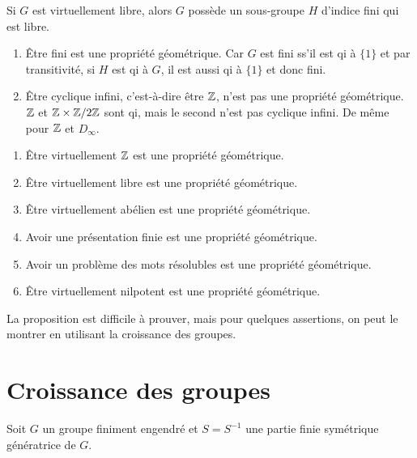   \begin{ex}
    Si $G$ est virtuellement libre, alors $G$ possède un sous-groupe $H$ d'indice fini qui est libre.
  \end{ex}

  \begin{exs}
    \begin{enumerate}
    \item \og Être fini \og est une propriété géométrique. Car $G$ est fini ss'il est qi à $\{1\}$ et par
      transitivité, si $H$ est qi à $G$, il est aussi qi à $\{1\}$ et donc fini.

    \item \og Être cyclique infini\fg{}, c'est-à-dire \og être $\mathbb{Z}$\fg{}, n'est pas une propriété
      géométrique. $\mathbb{Z}$ et $\mathbb{Z} \times \mathbb{Z}/2\mathbb{Z}$ sont qi, mais le second n'est pas cyclique infini. De même pour
      $\mathbb{Z}$ et $D_\infty$.
    \end{enumerate}
  \end{exs}


  \begin{prop}
    \begin{enumerate}
    \item Être virtuellement $\mathbb{Z}$ est une propriété géométrique.
    \item Être virtuellement libre est une propriété géométrique.
    \item Être virtuellement abélien est une propriété géométrique.
    \item Avoir une présentation finie est une propriété géométrique.
    \item Avoir un problème des mots résolubles est une propriété géométrique.
    \item Être virtuellement nilpotent est une propriété géométrique.
    \end{enumerate}
  \end{prop}

  La proposition est difficile à prouver, mais pour quelques assertions, on peut le montrer en utilisant la
  croissance des groupes.

  \section{Croissance des groupes}
  \label{sec:croiss-des-groupes}
  
    Soit $G$ un groupe finiment engendré et $S = S^{-1}$ une partie finie symétrique génératrice de $G$.

